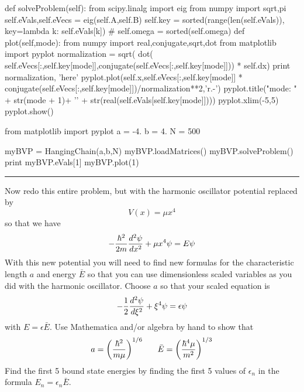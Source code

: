 \begin{enumerate}
\begin{codeexample}
\begin{VerbatimOut}{\listingFile}
    def solveProblem(self):
        from scipy.linalg import eig
        from numpy import sqrt,pi
        self.eVals,self.eVecs = eig(self.A,self.B)
        self.key = sorted(range(len(self.eVals)), key=lambda k: self.eVals[k])
        #        self.omega = sorted(self.omega)
    def plot(self,mode):
        from numpy import real,conjugate,sqrt,dot
        from matplotlib import pyplot
        normalization = sqrt( dot( self.eVecs[:,self.key[mode]],conjugate(self.eVecs[:,self.key[mode]])) * self.dx)
        print normalization, 'here'
        pyplot.plot(self.x,self.eVecs[:,self.key[mode]] * conjugate(self.eVecs[:,self.key[mode]])/normalization**2,'r.-')
        pyplot.title("mode:  " + str(mode + 1)+ '\n' +  str(real(self.eVals[self.key[mode]])))
        pyplot.xlim(-5,5)
        pyplot.show()


from matplotlib import pyplot
a = -4.
b = 4.
N = 500

myBVP = HangingChain(a,b,N)
myBVP.loadMatrices()
myBVP.solveProblem()
print myBVP.eVals[1]
myBVP.plot(1)
\end{VerbatimOut}
\end{codeexample}
\else
\noindent\rule{5 in}{0.01 in}
\fi



\prob \label{P:4.5}
Now redo this entire problem, but with the harmonic oscillator
potential replaced by
\begin{equation}
    V(x) = \mu x^4
\end{equation}
so that we have
\begin{equation}
    - {\hbar^2 \over 2 m} {d^2 \psi \over dx^2} + \mu x^4 \psi =
    E \psi
\end{equation}
With this new potential you will need to find new formulas for the
characteristic length $a$ and energy $\bar{E}$ so that you can use
dimensionless scaled variables as you did with the harmonic
oscillator. Choose $a$ so that your scaled equation is
\begin{equation}
    -{1 \over 2}{d^2 \psi \over d \xi^2} + \xi^4 \psi  = \epsilon \psi
\end{equation}
with $E=\epsilon \bar{E}$. Use Mathematica and/or algebra
by hand to show that
\begin{equation}
    a=\left( {\hbar^2 \over m \mu} \right)^{1/6}~~~~~
    \bar{E} =\left( {\hbar^4 \mu \over m^2} \right)^{1/3}
\end{equation}
Find the first 5 bound state energies by finding the first 5 values
of $\epsilon_n$ in the formula $E_n = \epsilon_n \bar{E}$.
\end{enumerate}
